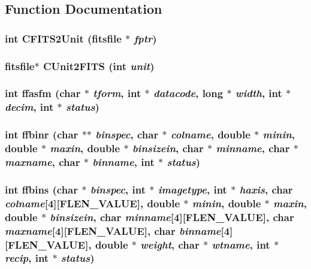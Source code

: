 \subsection{Function Documentation}
\subsubsection{\setlength{\rightskip}{0pt plus 5cm}int CFITS2Unit (\bf{fitsfile} $\ast$ {\em fptr})}\label{fitsio__64_8h_a383c3ad43a5dcb71a954e5b6ab7cdde}


\subsubsection{\setlength{\rightskip}{0pt plus 5cm}\bf{fitsfile}$\ast$ CUnit2FITS (int {\em unit})}\label{fitsio__64_8h_e08abd96bc54834ccfe5441c26d459de}


\subsubsection{\setlength{\rightskip}{0pt plus 5cm}int ffasfm (char $\ast$ {\em tform}, int $\ast$ {\em datacode}, long $\ast$ {\em width}, int $\ast$ {\em decim}, int $\ast$ {\em status})}\label{fitsio__64_8h_e10ab520ca972149eb9fafabd21a1606}


\subsubsection{\setlength{\rightskip}{0pt plus 5cm}int ffbinr (char $\ast$$\ast$ {\em binspec}, char $\ast$ {\em colname}, double $\ast$ {\em minin}, double $\ast$ {\em maxin}, double $\ast$ {\em binsizein}, char $\ast$ {\em minname}, char $\ast$ {\em maxname}, char $\ast$ {\em binname}, int $\ast$ {\em status})}\label{fitsio__64_8h_f9daf75aaa15d49359ba6fe025e80b86}


\subsubsection{\setlength{\rightskip}{0pt plus 5cm}int ffbins (char $\ast$ {\em binspec}, int $\ast$ {\em imagetype}, int $\ast$ {\em haxis}, char {\em colname}[4][FLEN\_\-VALUE], double $\ast$ {\em minin}, double $\ast$ {\em maxin}, double $\ast$ {\em binsizein}, char {\em minname}[4][FLEN\_\-VALUE], char {\em maxname}[4][FLEN\_\-VALUE], char {\em binname}[4][FLEN\_\-VALUE], double $\ast$ {\em weight}, char $\ast$ {\em wtname}, int $\ast$ {\em recip}, int $\ast$ {\em status})}\label{fitsio__64_8h_25532ba78224456d371c8724bdbc485f}


